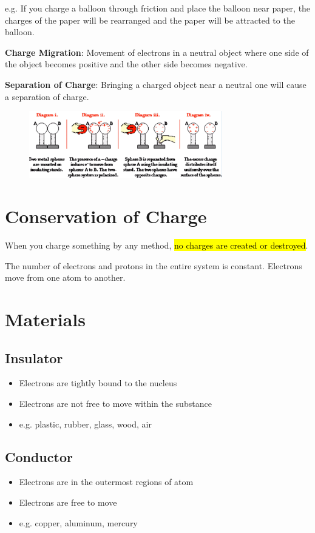 \documentclass[a4paper,12pt]{article}
\begin{document}
e.g. If you charge a balloon through friction and place the balloon near paper, the charges of the paper will be rearranged and the paper will be attracted to the balloon.

\textbf{Charge Migration}: Movement of electrons in a neutral object where one side of the object becomes positive and the other side becomes negative.

\textbf{Separation of Charge}: Bringing a charged object near a neutral one will cause a separation of charge.

\begin{figure}[H]
    \centering
    \includegraphics[width=0.75\textwidth]{induction}
\end{figure}

\section{Conservation of Charge}
When you charge something by any method, \hl{no charges are created or destroyed}.

The number of electrons and protons in the entire system is constant. Electrons move from one atom to another.

\section{Materials}
\subsection{Insulator}
\begin{itemize}
    \item{Electrons are tightly bound to the nucleus}
    \item{Electrons are not free to move within the substance}
    \item{e.g. plastic, rubber, glass, wood, air}
\end{itemize}

\subsection{Conductor}
\begin{itemize}
    \item{Electrons are in the outermost regions of atom}
    \item{Electrons are free to move}
    \item{e.g. copper, aluminum, mercury}
\end{itemize}
\end{document}
